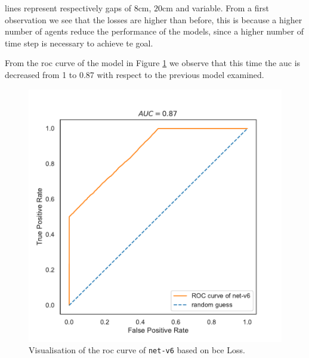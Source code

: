 \noindent
lines represent respectively gaps of $8$\gls{cm}, $20$\gls{cm} and variable. 
From a first observation we see that the losses are higher than before, this is 
because a higher number of agents reduce the performance of the models, since 
a higher number of time step is necessary to achieve te goal.

From the \gls{roc} curve of the model in Figure \ref{fig:net-v6auc} we observe 
that this time the \gls{auc} is decreased from 1 to 0.87 with respect to the 
previous model examined. 
\begin{figure}[!htb]
	\centering
	\includegraphics[width=.45\textwidth]{contents/images/net-v6/roc-net-v6(a)}%
	\caption[Evaluation of the \gls{roc} of \texttt{net-v6}.]{Visualisation of the 
		\gls{roc} curve of \texttt{net-v6} based on \gls{bce} Loss.}
	\label{fig:net-v6auc}
\end{figure}

